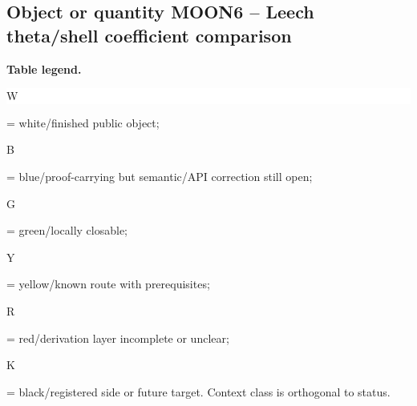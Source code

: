 \subsection*{Object or quantity MOON6 -- Leech theta/\allowbreak{}shell coefficient comparison}
\hypertarget{objproof:MOON6}{}
\par\smallskip\noindent\begin{minipage}{0.99\linewidth}\footnotesize\raggedright\textbf{Table legend.} \colorbox{white}{\strut W} = white/finished public object; \colorbox{cyan!20}{\strut B} = blue/proof-carrying but semantic/API correction still open; \colorbox{green!18}{\strut G} = green/locally closable; \colorbox{yellow!25}{\strut Y} = yellow/known route with prerequisites; \colorbox{red!20}{\strut R} = red/derivation layer incomplete or unclear; \colorbox{black!18}{\strut K} = black/registered side or future target. Context class is orthogonal to status.\end{minipage}\par\vspace{0.25em}
